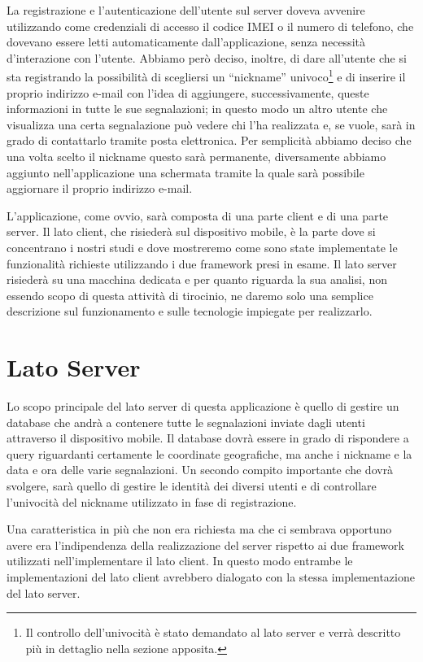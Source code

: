 	\noindent La registrazione e l'autenticazione dell'utente sul server doveva avvenire 
	utilizzando come credenziali di accesso il codice IMEI o il numero di
	telefono, che dovevano essere letti automaticamente dall'applicazione,
	senza necessità d'interazione con l'utente. Abbiamo però deciso, inoltre, di
	dare all'utente che si sta registrando la possibilità di scegliersi un
	``nickname'' univoco\footnote{Il controllo dell'univocità è stato demandato
	al lato server e verrà descritto più in dettaglio nella sezione apposita.}
	e di inserire il proprio indirizzo e-mail con l'idea di aggiungere,
	successivamente, queste informazioni in tutte le sue segnalazioni; in questo
	modo un altro utente che visualizza una certa segnalazione può vedere chi
	l'ha realizzata e, se vuole, sarà in grado di contattarlo tramite posta
	elettronica. Per semplicità abbiamo deciso che una volta scelto il nickname
	questo sarà permanente, diversamente abbiamo aggiunto nell'applicazione una
	schermata tramite la quale sarà possibile aggiornare il proprio indirizzo
	e-mail.
	
	L'applicazione, come ovvio, sarà composta di una parte client e di una parte
	server. Il lato client, che risiederà sul dispositivo mobile, è la parte dove
	si concentrano i nostri studi e dove
	mostreremo come sono state implementate le funzionalità richieste
	utilizzando i due frame\-work presi in esame. Il lato server risiederà
	su una macchina dedicata e per quanto riguarda la sua analisi, non
	essendo scopo di questa attività di tirocinio, ne daremo solo una
	semplice descrizione sul funzionamento e sulle tecnologie
	impiegate per realizzarlo.
	
	\section{Lato Server}
		Lo scopo principale del lato server di questa applicazione è quello di
		gestire un database che andrà a contenere tutte le segnalazioni inviate
		dagli utenti attraverso il dispositivo mobile. Il
		database dovrà essere in grado di rispondere a query riguardanti
		certamente le coordinate geografiche, ma anche i nickname e la data e
		ora delle varie segnalazioni. Un secondo compito importante che dovrà
		svolgere, sarà quello di gestire le identità dei diversi utenti e di
		controllare l'univocità del nickname utilizzato in fase di
		registrazione.
		
		Una caratteristica in più che non era richiesta ma che ci sembrava
		opportuno avere era l'indipendenza della realizzazione del server
		rispetto ai due frame\-work utilizzati nell'implementare il lato client.
		In questo modo entrambe le implementazioni del lato client avrebbero
		dialogato con la stessa implementazione del lato server.
		
